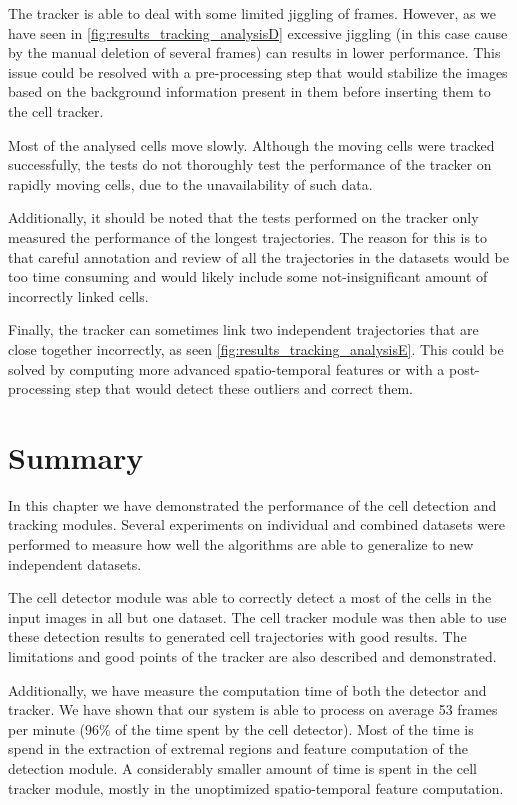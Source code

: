 	The tracker is able to deal with some limited jiggling of frames. However, as we have seen in \cref{fig:results_tracking_analysisD} excessive jiggling (in this case cause by the manual deletion of several frames) can results in lower performance. This issue could be resolved with a pre-processing step that would stabilize the images based on the background information present in them before inserting them to the cell tracker.
	
	Most of the analysed cells move slowly. Although the moving cells were tracked successfully, the tests do not thoroughly test the performance of the tracker on rapidly moving cells, due to the unavailability of such data.
	
	Additionally, it should be noted that the tests performed on the tracker only measured the performance of the longest trajectories. The reason for this is to that careful annotation and review of all the trajectories in the datasets would be too time consuming and would likely include some not-insignificant amount of incorrectly linked cells.
	
	Finally, the tracker can sometimes link two independent trajectories that are close together incorrectly, as seen \cref{fig:results_tracking_analysisE}. This could be solved by computing more advanced spatio-temporal features or with a post-processing step that would detect these outliers and correct them.
	
\section{Summary}
	\label{sec:results_summary}
	
	In this chapter we have demonstrated the performance of the cell detection and tracking modules. Several experiments on individual and combined datasets were performed to measure how well the algorithms are able to generalize to new independent datasets.
	
	The cell detector module was able to correctly detect a most of the cells in the input images in all but one dataset. The cell tracker module was then able to use these detection results to generated cell trajectories with good results. The limitations and good points of the tracker are also described and demonstrated.

	Additionally, we have measure the computation time of both the detector and tracker. We have shown that our system is able to process on average 53 frames per minute (96\% of the time spent by the cell detector). Most of the time is spend in the extraction of extremal regions and feature computation of the detection module. A considerably smaller amount of time is spent in the cell tracker module, mostly in the unoptimized spatio-temporal feature computation.